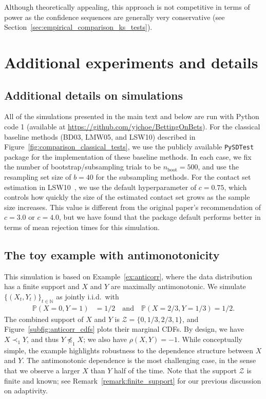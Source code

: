 \documentclass[12pt,twoside]{article}
\theoremstyle{plain}
\theoremstyle{definition}
\theoremstyle{remark}
\newcommand{\N}{\mathbb{N}}
\newcommand{\calZ}{\mathcal{Z}}
\newcommand{\Psymb}{\mathbb{P}}
\newcommand{\prob}[1]{\Psymb\left({#1}\right)}
\newcommand{\notfsd}{\npreceq_{1}}
\newcommand{\fsdstrict}{\prec_{1}}
\newcommand{\arxiv}{1}
\begin{document}
Although theoretically appealing, this approach is not competitive in terms of power as the confidence sequences are generally very conservative (see Section~\ref{sec:empirical_comparison_ks_tests}). 




\section{Additional experiments and details}\label{app:additional_experiments}

\subsection{Additional details on simulations}\label{app:additional_details_sims}

All of the simulations presented in the main text and below are run with Python code 
\if\arxiv1
{(available at \url{https://github.com/yjchoe/BettingOnBets}).}
\fi
For the classical baseline methods (BD03, LMW05, and LSW10) described in Figure~\ref{fig:comparison_classical_tests}, we use the publicly available \texttt{PySDTest}~\citep{lee2023pysdtest} package for the implementation of these baseline methods. 
In each case, we fix the number of bootstrap/subsampling trials to be $n_\text{boot}=500$, and use the resampling set size of $b=40$ for the subsampling methods. 
For the contact set estimation in LSW10~\citep{linton2010improved}, we use the default hyperparameter of $c=0.75$, which controls how quickly the size of the estimated contact set grows as the sample size increases. 
This value is different from the original paper's recommendation of $c=3.0$ or $c=4.0$, but we have found that the package default performs better in terms of mean rejection times for this simulation. 



\subsection{The toy example with antimonotonicity}\label{sec:sim_anticorr}


This simulation is based on Example~\ref{ex:anticorr}, where the data distribution has a finite support and $X$ and $Y$ are maximally antimonotonic. 
We simulate $\{(X_t, Y_t)\}_{t \in \N}$ as jointly i.i.d.~with
\begin{align*}
    \prob{X=0, Y=1} &= 1/2 \quad \text{and} \quad 
    \prob{X=2/3, Y=1/3} = 1/2.
\end{align*}
The combined support of $X$ and $Y$ is $\calZ = \{0, 1/3, 2/3, 1\}$, and Figure~\ref{subfig:anticorr_cdfs} plots their marginal CDFs. 
By design, we have $X \fsdstrict Y$, and thus $Y \notfsd X$; we also have $\rho(X, Y)=-1$. 
While conceptually simple, the example highlights robustness to the dependence structure between $X$ and $Y$. 
The antimonotonic dependence is the most challenging case, in the sense that we observe a larger $X$ than $Y$ half of the time. 
Note that the support $\calZ$ is finite and known; see Remark~\ref{remark:finite_support} for our previous discussion on adaptivity. 
\end{document}
